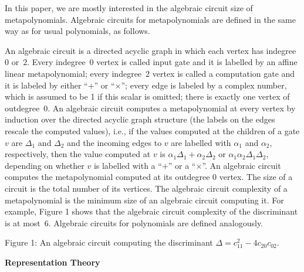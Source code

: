 In this paper, we are mostly interested in the algebraic circuit size of metapolynomials. Algebraic circuits for metapolynomials are defined in the same way as for usual polynomials, as follows.





An algebraic circuit is a directed acyclic graph in which each vertex
has indegree $0$ or $2$. Every indegree 0 vertex is called input gate and it is labelled by an affine linear metapolynomial; every indegree 2 vertex is called a computation gate and it is labeled by either “$+$” or “$\times$”; every edge is labeled by a complex number, which is assumed to be 1 if this scalar is omitted; there is exactly one vertex of outdegree 0. An algebraic circuit computes a metapolynomial at every vertex by induction over the directed acyclic graph structure (the labels on the edges rescale the computed values), i.e.,
if the values computed at the children of a gate $v$ are $\Delta_{1}$ and $\Delta_{2}$ and the incoming edges to $v$ are labelled with $\alpha_{1}$ and $\alpha_{2}$, respectively, then the value computed at $v$ is $\alpha_{1}\Delta_{1}+\alpha_{2}\Delta_{2}$ or $\alpha_{1}\alpha_{2}\Delta_{1}\Delta_{2}$, depending on whether $v$ is labelled with a “$+$” or a “$\times$”.
An algebraic circuit computes the metapolynomial computed at its outdegree 0 vertex.
The size of a circuit is the total number of its vertices. The algebraic circuit complexity of a metapolynomial is the minimum size of an algebraic circuit computing it.
For example, Figure 1 shows that the algebraic circuit complexity of the discriminant is at most 6. Algebraic circuits for polynomials are defined analogously.




Figure 1: An algebraic circuit computing the discriminant $\Delta=c_{11}^{2}-4c_{20}c_{02}$.




\par\medskip\noindent\textbf{Representation Theory}\par




